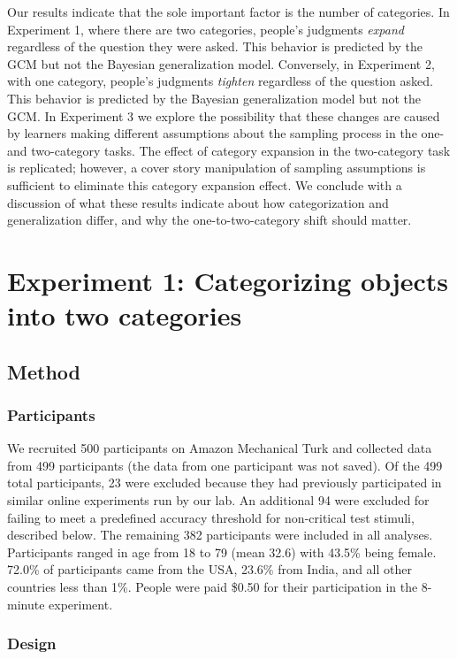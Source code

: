 \documentclass[doc,apacite]{apa6}
\begin{document}
Our results indicate that the sole important factor is the number of categories. In Experiment 1, where there are two categories, people's judgments {\it expand} regardless of the question they were asked. This behavior is predicted by the GCM but not the Bayesian generalization model. Conversely, in Experiment 2, with one category, people's judgments {\it tighten} regardless of the question asked. This behavior is predicted by the Bayesian generalization model but not the GCM.
In Experiment 3 we explore the possibility that these changes are caused by learners making different assumptions about the sampling process in the one- and two-category tasks. The effect of category expansion in the two-category task is replicated; however, a cover story manipulation of sampling assumptions is sufficient to eliminate this category expansion effect.
We conclude with a discussion of what these results indicate about how categorization and generalization differ, and why the one-to-two-category shift should matter.

\section{Experiment 1: Categorizing objects into two categories}

\subsection{Method}

\subsubsection{Participants}

We recruited 500 participants on Amazon Mechanical Turk and collected data from 499 participants (the data from one participant was not saved). Of the 499 total participants,
23 were excluded because they had previously participated in similar online experiments run by our lab. An additional 94 were excluded for failing to meet a predefined accuracy threshold for non-critical test stimuli, described below. The remaining 382 participants were included in all analyses. Participants ranged in age from 18 to 79 (mean 32.6) with 43.5\% being female. 72.0\% of participants came from the USA, 23.6\% from India, and all other countries less than 1\%. People were paid \$0.50 for their participation in the 8-minute experiment.

\subsubsection{Design}
\end{document}
